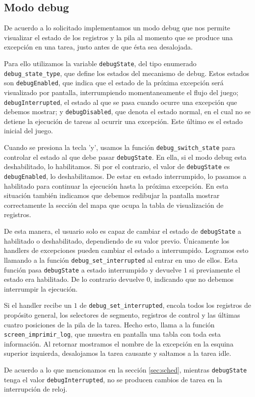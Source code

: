 \subsection{Modo debug}
\label{sec:debug}
De acuerdo a lo solicitado implementamos un modo debug que nos permite visualizar el estado de los registros y la pila al momento que se produce una excepción en una tarea, justo antes de que ésta sea desalojada.

Para ello utilizamos la variable \verb|debugState|, del tipo enumerado \verb|debug_state_type|, que define los estados del mecanismo de debug.
Estos estados son \verb|debugEnabled|, que indica que el estado de la próxima excepción será visualizado por pantalla, interrumpiendo momentaneamente el flujo del juego; \verb|debugInterrupted|, el estado al que se pasa cuando ocurre una excepción que debemos mostrar; y \verb|debugDisabled|, que denota el estado normal, en el cual no se detiene la ejecución de tareas al ocurrir una excepción. Este último es el estado inicial del juego.

Cuando se presiona la tecla 'y', usamos la función \verb|debug_switch_state| para controlar el estado al que debe pasar \verb|debugState|. En ella, si el modo debug esta deshabilitado, lo habilitamos. Si por el contrario, el valor de \verb|debugState| es \verb|debugEnabled|, lo deshabilitamos.
De estar en estado interrumpido, lo pasamos a habilitado para continuar la ejecución hasta la próxima excepción. 
En esta situación también indicamos que debemos redibujar la pantalla mostrar correctamente la sección del mapa que ocupa la tabla de visualización de registros.

De esta manera, el usuario solo es capaz de cambiar el estado de \verb|debugState| a habilitado o deshabilitado, dependiendo de su valor previo. Únicamente los handlers de excepciones pueden cambiar el estado a interrumpido. Logramos esto llamando a la función \verb|debug_set_interrupted| al entrar en uno de ellos. 
Esta función pasa \verb|debugState| a estado interrumpido y devuelve $1$ si previamente el estado era habilitado. De lo contrario devuelve $0$, indicando que no debemos interrumpir la ejecución.

Si el handler recibe un $1$ de \verb|debug_set_interrupted|, encola todos los registros de propósito general, los selectores de segmento, registros de control y las últimas cuatro posiciones de la pila de la tarea. Hecho esto, llama a la función \verb|screen_imprimir_log|, que muestra en pantalla una tabla con toda esta información.
Al retornar mostramos el nombre de la excepción en la esquina superior izquierda, desalojamos la tarea causante y saltamos a la tarea idle.

De acuerdo a lo que mencionamos en la sección \ref{sec:sched}, mientras \verb|debugState| tenga el valor \verb|debugInterrupted|, no se producen cambios de tarea en la interrupción de reloj.

